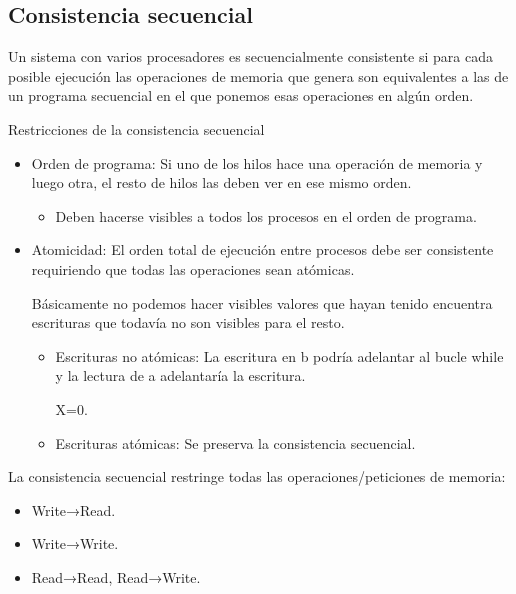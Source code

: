 \documentclass[12pt, twoside, openright]{report} %
\begin{document}
\subsection{Consistencia secuencial}

Un sistema con varios procesadores es secuencialmente consistente
si para cada posible ejecución las operaciones de memoria que
genera son equivalentes a las de un programa secuencial en el que
ponemos esas operaciones en algún orden.

Restricciones de la consistencia secuencial

\begin{itemize}
	\item Orden de programa: Si uno de los hilos hace una operación de
	      memoria y luego otra, el resto de hilos las deben ver en ese
	      mismo orden.

	      \begin{itemize}

		      \item Deben hacerse visibles a todos los procesos en el orden de
		            programa.
	      \end{itemize}
	\item Atomicidad: El orden total de ejecución entre procesos debe ser
	      consistente requiriendo que todas las operaciones sean atómicas.

	      Básicamente no podemos hacer visibles valores que hayan tenido
	      encuentra escrituras que todavía no son visibles para el resto.

	      \begin{itemize}
		      \item Escrituras no atómicas: La escritura en b podría adelantar al bucle while y la
		            lectura de a adelantaría la escritura.

		            X=0.
		      \item Escrituras atómicas: Se preserva la consistencia secuencial.
	      \end{itemize}
\end{itemize}



La consistencia secuencial restringe todas las
operaciones/peticiones de memoria:

\begin{itemize}

	\item Write→Read.
	\item Write→Write.
	\item Read→Read, Read→Write.
\end{itemize}
\end{document}
